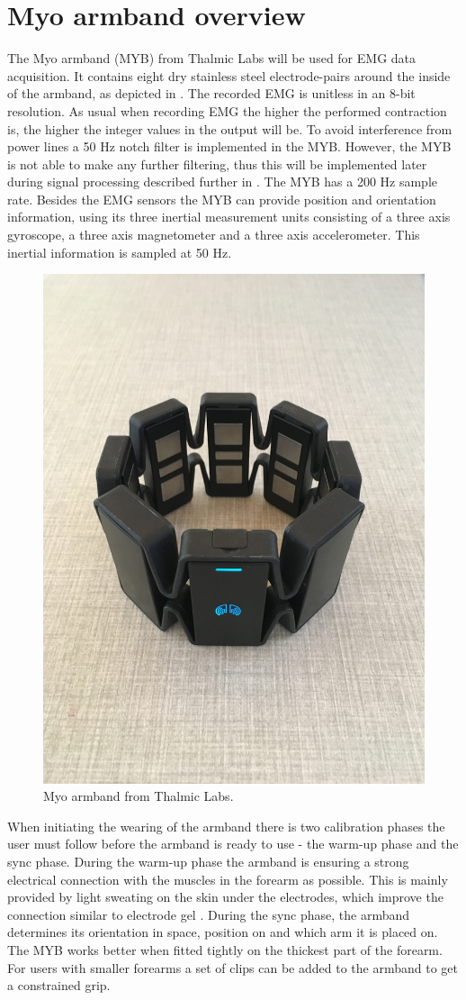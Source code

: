 \section{Myo armband overview} \label{sec:MYB}

The Myo armband (MYB) from Thalmic Labs will be used for EMG data acquisition. It contains eight dry stainless steel electrode-pairs around the inside of the armband, as depicted in . The recorded EMG is unitless in an 8-bit resolution. As usual when recording EMG the higher the performed contraction is, the higher the integer values in the output will be. To avoid interference from power lines a 50 Hz notch filter is implemented in the MYB. However, the MYB is not able to make any further filtering, thus this will be implemented later during signal processing described further in . The MYB has a 200 Hz sample rate. Besides the EMG sensors the MYB can provide position and orientation information, using its three inertial measurement units consisting of a three axis gyroscope, a three axis magnetometer and a three axis accelerometer. This inertial information is sampled at 50 Hz. \cite{Myoarmband2013}

\begin{figure}[H]                 
	\includegraphics[width=.4\textwidth]{figures/xBackground/myoband}  
	\caption{Myo armband from Thalmic Labs.}
	\label{fig:myoarmband} 
\end{figure}

When initiating the wearing of the armband there is two calibration phases the user must follow before the armband is ready to use - the warm-up phase and the sync phase. During the warm-up phase the armband is ensuring a strong electrical connection with the muscles in the forearm as possible. This is mainly provided by light sweating on the skin under the electrodes, which improve the connection similar to electrode gel \cite{Cram2012}. During the sync phase, the armband determines its orientation in space, position on and which arm it is placed on. The MYB works better when fitted tightly on the thickest part of the forearm. For users with smaller forearms a set of clips can be added to the armband to get a constrained grip. \cite{Myoarmband2013}
